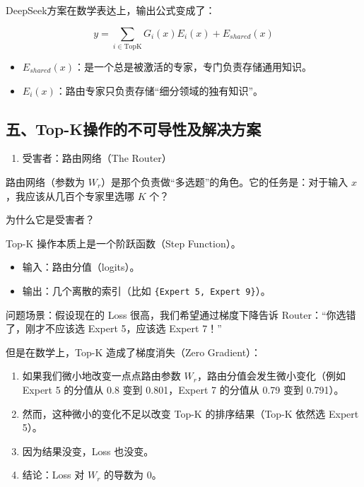DeepSeek方案在数学表达上，输出公式变成了：

\[
y=\sum_{i\in \mathrm{TopK}}G_i(x)E_i(x)+E_{shared}(x)
\]

\begin{itemize}
\tightlist
\item
  \(E_{shared}(x)\)：是一个总是被激活的专家，专门负责存储通用知识。
\item
  \(E_i(x)\)：路由专家只负责存储``细分领域的独有知识''。
\end{itemize}

\hypertarget{ux4e94top-kux64cdux4f5cux7684ux4e0dux53efux5bfcux6027ux53caux89e3ux51b3ux65b9ux6848}{%
\subsection{五、Top-K操作的不可导性及解决方案}\label{ux4e94top-kux64cdux4f5cux7684ux4e0dux53efux5bfcux6027ux53caux89e3ux51b3ux65b9ux6848}}

\begin{enumerate}
\def\labelenumi{\arabic{enumi}.}
\tightlist
\item
  受害者：路由网络（The Router）
\end{enumerate}

路由网络（参数为 \(W_r\)）是那个负责做``多选题''的角色。它的任务是：对于输入 \(x\)，我应该从几百个专家里选哪 \(K\) 个？

为什么它是受害者？

Top-K 操作本质上是一个阶跃函数（Step Function）。

\begin{itemize}
\tightlist
\item
  输入：路由分值（logits）。
\item
  输出：几个离散的索引（比如 \texttt{\{Expert\ 5,\ Expert\ 9\}}）。
\end{itemize}

问题场景：假设现在的 Loss 很高，我们希望通过梯度下降告诉 Router：``你选错了，刚才不应该选 Expert 5，应该选 Expert 7！''

但是在数学上，Top-K 造成了梯度消失（Zero Gradient）：

\begin{enumerate}
\def\labelenumi{\arabic{enumi}.}
\tightlist
\item
  如果我们微小地改变一点点路由参数 \(W_r\)，路由分值会发生微小变化（例如 Expert 5 的分值从 0.8 变到 0.801，Expert 7 的分值从 0.79 变到 0.791）。
\item
  然而，这种微小的变化不足以改变 Top-K 的排序结果（Top-K 依然选 Expert 5）。
\item
  因为结果没变，Loss 也没变。
\item
  结论：Loss 对 \(W_r\) 的导数为 0。
\end{enumerate}

